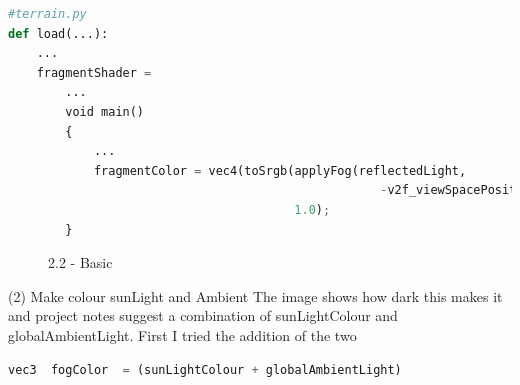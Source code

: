 \documentclass[a4 paper, 12pt]{article}
\begin{document}
\begin{lstlisting}[language=python]
#terrain.py
def load(...):
    ...
    fragmentShader = 
        ...
        void main()
        {
            ...
            fragmentColor = vec4(toSrgb(applyFog(reflectedLight, 
                                                    -v2f_viewSpacePosition.z)), 
                                        1.0);
        }
\end{lstlisting} 

\begin{figure} [H]
    \caption{2.2 - Basic}   
\end{figure}


(2) Make colour sunLight and Ambient
The image shows how dark this makes it and project notes suggest a combination of sunLightColour and globalAmbientLight. First I tried the addition of the two
\begin{lstlisting}[language=python]
    vec3  fogColor  = (sunLightColour + globalAmbientLight)
\end{lstlisting} 
\end{document}

